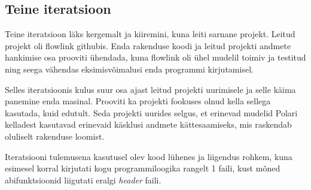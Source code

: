 \subsection{Teine iteratsioon}
Teine iteratsioon läks kergemalt ja kiiremini, kuna leiti sarnane projekt.
Leitud projekt oli flowlink\cite{flowlink-git} githubis.
Enda rakenduse koodi ja leitud projekti andmete hankimise osa prooviti ühendada, kuna flowlink oli ühel mudelil toimiv ja testitud ning seega vähendas eksimisvõimalusi enda programmi kirjutamisel.

Selles iteratsioonis kulus suur osa ajast leitud projekti uurimisele ja selle käima panemine enda masinal.
Prooviti ka projekti fookuses olnud kella sellega kasutada, kuid edutult.
Seda projekti uurides selgus, et erinevad mudelid Polari kelladest kasutavad erinevaid käsklusi andmete kättesaamiseks, mis raskendab oluliselt rakenduse loomist.

Iteratsiooni tulemusena kasutusel olev kood lühenes ja liigendus rohkem, kuna esimesel korral kirjutati kogu programmiloogika rangelt 1 faili, kust mõned abifunktsioonid liigutati eralgi \textit{header} faili.